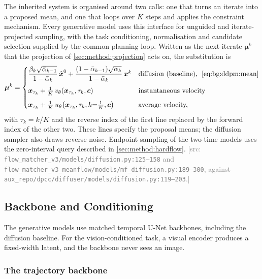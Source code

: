 \documentclass[headsepline,footsepline,footinclude=false,oneside,fontsize=11pt,paper=a4,listof=totoc,bibliography=totoc]{scrbook}
\theoremstyle{definition}
\theoremstyle{plain}
\theoremstyle{remark}
\newcommand{\vect}[1]{\boldsymbol{#1}}
\newcommand{\vfield}{v}                        %
\newcommand{\afield}{u}                        %
\newcommand{\ftime}{\tau}                      %
\newcommand{\nfe}{K}                           %
\newif\ifsubmission
\newcommand{\srcnote}[1]{\ifsubmission\else\textcolor{gray}{\footnotesize\textsf{[src: #1]}}\fi}
\begin{document}
The inherited system is organised around two calls: one that turns an iterate into a proposed
mean, and one that loops over $\nfe$ steps and applies the constraint mechanism. Every generative model
uses this interface for unguided and iterate-projected sampling, with the task
conditioning, normalisation and candidate selection supplied by the common planning loop. Written as the next iterate $\vect{\mu}^{k}$ that the projection of
\autoref{sec:method:projection} acts on, the substitution is
\begin{equation}\label{eq:method:engine:iface}
  \vect{\mu}^{k}
  = \begin{cases}
      \dfrac{\beta_{k}\sqrt{\bar{\alpha}_{k-1}}}{1-\bar{\alpha}_{k}}\,\hat{\vect{x}}^{0}
        + \dfrac{(1-\bar{\alpha}_{k-1})\sqrt{\alpha_{k}}}{1-\bar{\alpha}_{k}}\,\vect{x}^{k}
        & \text{diffusion (baseline),\; \eqref{eq:bg:ddpm:mean}}\\[10pt]
      \vect{x}_{\ftime_{k}} + \tfrac{1}{\nfe}\,
        \vfield_{\theta}\!\left(\vect{x}_{\ftime_{k}},\ftime_{k},\vect{c}\right)
        & \text{instantaneous velocity}\\[6pt]
      \vect{x}_{\ftime_{k}} + \tfrac{1}{\nfe}\,
        \afield_{\theta}\!\left(\vect{x}_{\ftime_{k}},\ftime_{k},h{=}\tfrac{1}{\nfe},\vect{c}\right)
        & \text{average velocity,}
    \end{cases}
\end{equation}
with $\ftime_{k} = k/\nfe$ and the reverse index of the first line replaced by the forward index
of the other two. These lines specify the proposal means; the diffusion sampler also draws reverse
noise. Endpoint sampling of the two-time models uses the zero-interval query described in
\autoref{sec:method:hardflow}.
\srcnote{\texttt{flow\_matcher\_v3/models/diffusion.py:125--158} and
\texttt{flow\_matcher\_v3\_meanflow/models/mf\_diffusion.py:189--300}, against
\texttt{aux\_repo/dpcc/diffuser/models/diffusion.py:119--203}.}

\subsection{Backbone and Conditioning}\label{sec:method:backbone}

The generative models use matched temporal U-Net backbones, including the diffusion baseline. For the vision-conditioned task, a visual encoder produces a fixed-width latent, and the
backbone never sees an image.

\subsubsection*{The trajectory backbone}
\end{document}
